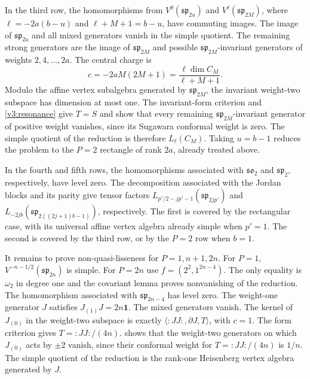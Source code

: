 \documentclass[11pt,a4paper]{amsart}
\numberwithin{equation}{section}
\theoremstyle{definition}
\theoremstyle{remark}
\newcommand{\spg}{\mathfrak{sp}}
\newcommand{\sog}{\mathfrak{so}}
\begin{document}
In the third row, the homomorphisms from $V^0(\spg_{2u})$ and
$V^\ell(\spg_{2M})$, where $\ell=-2a(b-u)$ and $\ell+M+1=b-u$,
have commuting images. The image of $\spg_{2u}$ and all mixed
generators vanish in the simple quotient. The remaining strong
generators are the image of $\spg_{2M}$ and possible
$\spg_{2M}$-invariant generators of weights $2,4,\ldots,2a$.
The central charge is
$$
 c=-2aM(2M+1)=\frac{\ell\dim C_M}{\ell+M+1}.
$$
Modulo the affine vertex subalgebra generated by $\spg_{2M}$,
the invariant weight-two subspace has dimension at most one.
The invariant-form criterion and \cref{v3:resonance} give $T=S$ and
show that every remaining $\spg_{2M}$-invariant generator of positive
weight vanishes, since its Sugawara conformal weight is zero.
The simple quotient of the reduction is therefore $L_\ell(C_M)$.
Taking $u=b-1$ reduces the problem to the $P=2$ rectangle of rank $2a$, already treated above.

In the fourth and fifth rows, the homomorphisms associated with
$\sog_2$ and $\spg_2$, respectively, have level zero. The decomposition
associated with the Jordan blocks and its parity give tensor factors
$L_{p'/2-jp'-1}(\spg_{2jp'})$ and
$L_{-2jb}(\spg_{2((2j+1)b-1)})$, respectively. The first is covered
by the rectangular case, with its universal affine vertex algebra already
simple when $p'=1$. The second is covered by the third row, or by the
$P=2$ row when $b=1$.

It remains to prove non-quasi-lisseness for $P=1,n+1,2n$.
For $P=1$, $V^{-n-1/2}(\spg_{2n})$ is simple. For $P=2n$ use $f=(2^2,1^{2n-4})$.
The only equality is $\omega_2$ in degree one and the covariant lemma
proves nonvanishing of the reduction. The homomorphism associated with
$\spg_{2n-4}$ has level zero. The weight-one generator $J$ satisfies
$J_{(1)}J=2n\mathbf1$. The mixed generators vanish. The kernel of
$J_{(0)}$ in the weight-two subspace is exactly
$\langle:JJ:,\partial J,T\rangle$, with $c=1$.
The form criterion gives $T=:JJ:/(4n)$.  shows that the weight-two generators on which $J_{(0)}$ acts by
$\pm2$ vanish, since their conformal weight for $T=:JJ:/(4n)$ is $1/n$.
The simple quotient of the reduction is the rank-one Heisenberg vertex
algebra generated by $J$.
\end{document}
